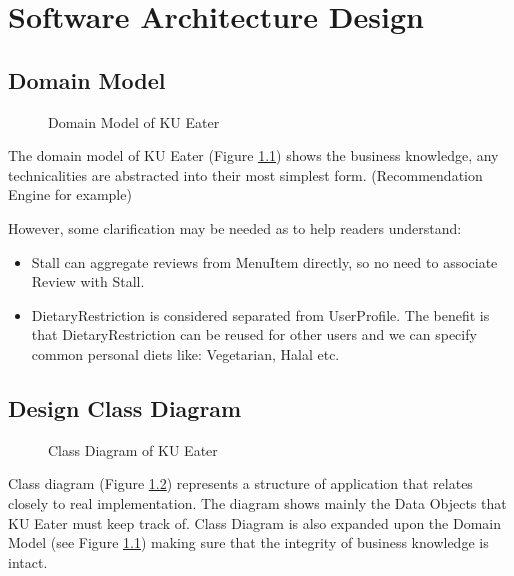 \chapter{Software Architecture Design}
\label{chap:software-architecture-design}

\section{Domain Model}
\label{section:domain-model}

\begin{figure}[h!]
    \centering
    \caption{Domain Model of KU Eater}
    \label{fig:domain-model}
\end{figure}

The domain model of KU Eater (Figure \ref{fig:domain-model}) shows the business knowledge, any technicalities are abstracted into their most simplest form. (Recommendation Engine for example)

However, some clarification may be needed as to help readers understand:

\begin{itemize}
    \item Stall can aggregate reviews from MenuItem directly, so no need to associate Review with Stall.
    \item DietaryRestriction is considered separated from UserProfile. The benefit is that DietaryRestriction can be reused for other users
    and we can specify common personal diets like: Vegetarian, Halal etc.
\end{itemize}

\section{Design Class Diagram}
\label{section:design-class-diagram}

\begin{figure}[h!]
    \centering
    \caption{Class Diagram of KU Eater}
    \label{fig:class-diagram}
\end{figure}

Class diagram (Figure \ref{fig:class-diagram}) represents a structure of application that relates closely to real implementation. The diagram
shows mainly the Data Objects that KU Eater must keep track of. Class Diagram is also expanded upon the Domain Model (see Figure \ref{fig:domain-model})
making sure that the integrity of business knowledge is intact.

